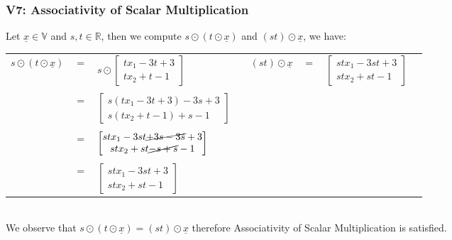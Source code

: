 \documentclass{article}
\begin{document}
\subsubsection*{V7: Associativity of Scalar Multiplication}
Let $\underline{x}\in\mathbb{V}$ and $s,t\in\mathbb{R}$, then we compute $s\odot(t\odot\underline{x})$ and $(st)\odot\underline{x}$, we have:\\
\begin{table}[htp]
\centering
\begin{tabular}{cclc|cccc}
  $s\odot(t\odot\underline{x})$ & $=$  & $s\odot\begin{bmatrix} tx_{1}-3t+3\\tx_{2}+t-1\end{bmatrix}$  &   & $(st)\odot\underline{x}$  & $=$  & $\begin{bmatrix} 
  stx_{1}-3st+3\\stx_{2}+st-1
  \end{bmatrix}$  &   \\
  &&&&&&&\\
      & $=$  & $\begin{bmatrix} s(tx_{1}-3t+3)-3s+3\\s(tx_{2}+t-1)+s-1\end{bmatrix}$  &  & &   &   &   \\
      &&&&&&&\\    
      & $=$  & $\begin{bmatrix} stx_{1}-3st\cancel{+3s-3s}+3\\stx_{2}+st\cancel{-s+s}-1\end{bmatrix}$  & &  &   &   &   \\
    &&&&&&&\\  
      & $=$  & $\begin{bmatrix} stx_{1}-3st+3\\stx_{2}+st-1\end{bmatrix}$  &   & &  &   &   \\
\end{tabular}
\end{table}\\
We observe that $s\odot(t\odot\underline{x}) = (st)\odot\underline{x}$ therefore Associativity of Scalar Multiplication is satisfied.
\end{document}

